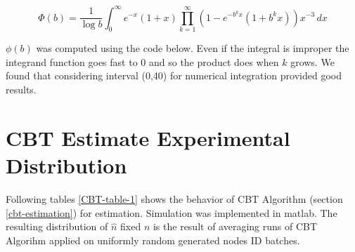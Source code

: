 \begin{appendices}
\begin{equation}
\Phi(b)= \frac{1}{\log b} \int_{0}^{\infty} \! e^{-x}(1+x) \prod_{k=1}^{\infty}(1-e^{-b^{k}x}(1+b^{k}x))x^{-3} \, dx
\label{eq:greenberg-b-Phi}
\end{equation}

\noindent $\phi(b)$ was computed using the code below. Even if the integral is improper the integrand function goes fast to 0 and so the product does when $k$ grows. We found that considering interval (0,40) for numerical integration provided good results.\\






\section{CBT Estimate Experimental Distribution}

Following tables \ref{CBT-table-1} shows the behavior of CBT Algorithm (section \ref{cbt-estimation}) for estimation.  Simulation was implemented in matlab.
The resulting distribution of $\hat{n}$ fixed $n$ is the result of averaging  runs of CBT Algorihm applied on uniformly random generated nodes ID batches.\\ 

\begin{table}[H]
\caption[Experimentally computed CBT Estimate Distributon]{Experimentally computed CBT Estimate Distributon. Table 1/3}
\label{CBT-table-1}
\end{table}
\end{appendices}
